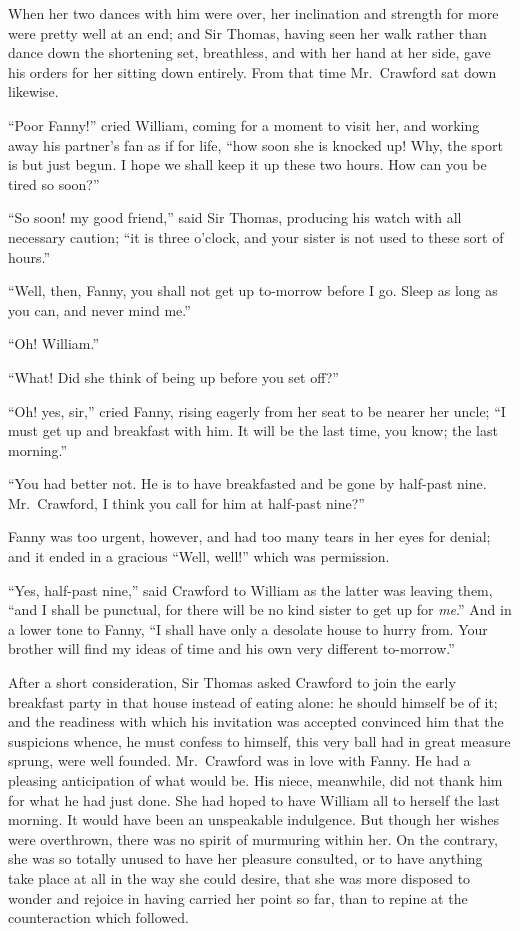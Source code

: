 When her two dances with him were over, her inclination
and strength for more were pretty well at an end;
and Sir Thomas, having seen her walk rather than dance
down the shortening set, breathless, and with her hand at
her side, gave his orders for her sitting down entirely.
From that time Mr.\ Crawford sat down likewise.

``Poor Fanny!'' cried William, coming for a moment to visit her,
and working away his partner's fan as if for life, ``how soon
she is knocked up!  Why, the sport is but just begun.
I hope we shall keep it up these two hours.  How can you
be tired so soon?''

``So soon! my good friend,'' said Sir Thomas, producing his
watch with all necessary caution; ``it is three o'clock,
and your sister is not used to these sort of hours.''

``Well, then, Fanny, you shall not get up to-morrow before
I go.  Sleep as long as you can, and never mind me.''

``Oh!  William.''

``What!  Did she think of being up before you set off?''

``Oh! yes, sir,'' cried Fanny, rising eagerly from her seat
to be nearer her uncle; ``I must get up and breakfast with him.
It will be the last time, you know; the last morning.''

``You had better not.  He is to have breakfasted and be
gone by half-past nine.  Mr.\ Crawford, I think you call
for him at half-past nine?''

Fanny was too urgent, however, and had too many tears in her
eyes for denial; and it ended in a gracious ``Well, well!''
which was permission.

``Yes, half-past nine,'' said Crawford to William as the
latter was leaving them, ``and I shall be punctual,
for there will be no kind sister to get up for \emph{me}.''
And in a lower tone to Fanny, ``I shall have only a desolate
house to hurry from.  Your brother will find my ideas
of time and his own very different to-morrow.''

After a short consideration, Sir Thomas asked Crawford
to join the early breakfast party in that house
instead of eating alone:  he should himself be of it;
and the readiness with which his invitation was accepted
convinced him that the suspicions whence, he must confess
to himself, this very ball had in great measure sprung,
were well founded.  Mr.\ Crawford was in love with Fanny.
He had a pleasing anticipation of what would be.  His niece,
meanwhile, did not thank him for what he had just done.
She had hoped to have William all to herself the last morning.
It would have been an unspeakable indulgence.  But though
her wishes were overthrown, there was no spirit of murmuring
within her.  On the contrary, she was so totally unused
to have her pleasure consulted, or to have anything take
place at all in the way she could desire, that she was more
disposed to wonder and rejoice in having carried her point
so far, than to repine at the counteraction which followed.


